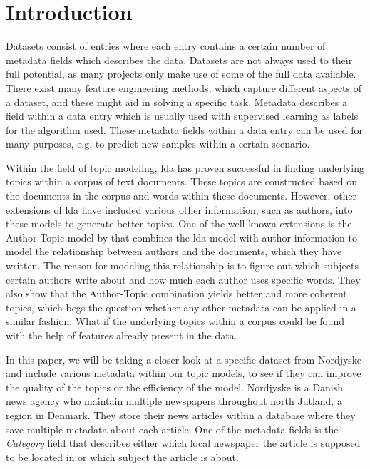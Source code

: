 \section{Introduction}\label{sec:introduction}
Datasets consist of entries where each entry contains a certain number of metadata fields which describes the data.
Datasets are not always used to their full potential, as many projects only make use of some of the full data available.
There exist many feature engineering methods, which capture different aspects of a dataset, and these might aid in solving a specific task.
Metadata describes a field within a data entry which is usually used with supervised learning as labels for the algorithm used.
These metadata fields within a data entry can be used for many purposes, e.g. to predict new samples within a certain scenario.

Within the field of topic modeling, \gls{lda} has proven successful in finding underlying topics within a corpus of text documents.
These topics are constructed based on the documents in the corpus and words within these documents. 
However, other extensions of \gls{lda} have included various other information, such as authors, into these models to generate better topics.
One of the well known extensions is the Author-Topic model by \citet{author_topic} that combines the \gls{lda} model with author information to model the relationship between authors and the documents, which they have written.
The reason for modeling this relationship is to figure out which subjects certain authors write about and how much each author uses specific words. 
They also show that the Author-Topic combination yields better and more coherent topics, which begs the question whether any other metadata can be applied in a similar fashion.
What if the underlying topics within a corpus could be found with the help of features already present in the data.

In this paper, we will be taking a closer look at a specific dataset from Nordjyske and include various metadata within our topic models, to see if they can improve the quality of the topics or the efficiency of the model.
Nordjyske is a Danish news agency who maintain multiple newspapers throughout north Jutland, a region in Denmark.
They store their news articles within a database where they save multiple metadata about each article.
One of the metadata fields is the \emph{Category} field that describes either which local newspaper the article is supposed to be located in or which subject the article is about.

